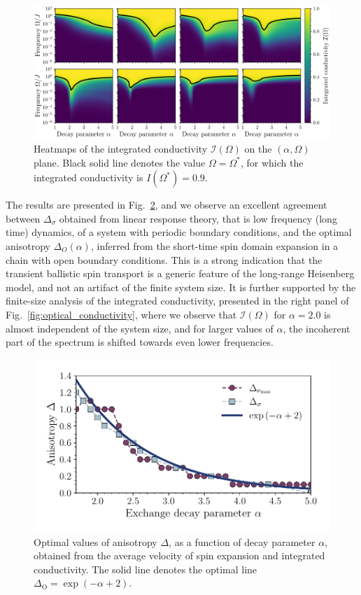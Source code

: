 \begin{figure}[htbp]
  \centering
  \includegraphics[width=\linewidth]{Figures/I_cond_heatmap.png}
  \caption{Heatmaps of the integrated conductivity \(\mathcal{I}(\Omega)\) on the \((\alpha ,\Omega)\) plane.
    Black solid line denotes the value \(\Omega = \Omega^{\ast}\),
    for which the integrated conductivity is \(I(\Omega^{\ast}) = 0.9\).}
  \label{fig:I_cond_heatmap}
\end{figure}

The results are presented in Fig.~\ref{fig:optimal_anisotropy}, and we observe an excellent
agreement between \(\Delta_{\sigma}\) obtained from linear response theory, that is low frequency (long time) dynamics,
of a system with periodic boundary conditions,
and the optimal anisotropy \(\Delta_{O}(\alpha)\), inferred from the short-time spin domain expansion in a chain
with open boundary conditions. This is a strong indication that the transient ballistic spin transport
is a generic feature of the long-range Heisenberg model, and not an artifact of the finite system size.
It is further supported by the finite-size analysis of the integrated conductivity, presented in the right panel
of Fig.~\ref{fig:optical_conductivity}, where we observe that \(\mathcal{I}(\Omega)\) for \(\alpha = 2.0\)
is almost independent of the system size, and for larger values of \(\alpha\), the incoherent part of the spectrum
is shifted towards even lower frequencies.

\begin{figure}[htbp]
  \centering
  \includegraphics[width=0.8\linewidth]{Figures/optimal_anisotropies.pdf}
  \caption{Optimal values of anisotropy \(\Delta\), as a function of decay parameter \(\alpha\), obtained from
    the average velocity of spin expansion and integrated conductivity. The solid line denotes the optimal line
    \(\Delta_{\mathrm{O}} = \exp\left(-\alpha + 2\right)\).}
  \label{fig:optimal_anisotropy}
\end{figure}


